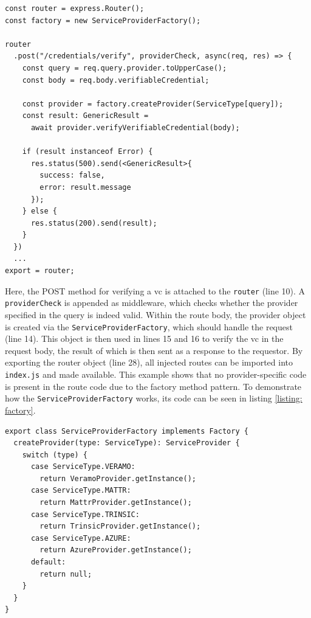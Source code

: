 \begin{lstlisting}[style=ES6, caption=Extract of verifier routes, label={listing: verifier routes}]
const router = express.Router();
const factory = new ServiceProviderFactory();

router
  .post("/credentials/verify", providerCheck, async(req, res) => {
    const query = req.query.provider.toUpperCase();
    const body = req.body.verifiableCredential;
    
    const provider = factory.createProvider(ServiceType[query]);
    const result: GenericResult =
      await provider.verifyVerifiableCredential(body);
      
    if (result instanceof Error) {
      res.status(500).send(<GenericResult>{ 
        success: false, 
        error: result.message 
      });
    } else {
      res.status(200).send(result);
    }
  })
  ...
export = router;
\end{lstlisting}

    Here, the POST method for verifying a \ac{vc} is attached to the \texttt{router} (line 10). A \texttt{providerCheck} is appended as middleware, which checks whether the provider specified in the query is indeed valid. Within the route body, the provider object is created via the \texttt{ServiceProviderFactory}, which should handle the request (line 14). This object is then used in lines 15 and 16 to verify the \ac{vc} in the request body, the result of which is then sent as a response to the requestor. By exporting the router object (line 28), all injected routes can be imported into \texttt{index.js} and made available. This example shows that no provider-specific code is present in the route code due to the factory method pattern. To demonstrate how the \texttt{ServiceProviderFactory} works, its code can be seen in listing \ref{listing: factory}.
    \newpage
\begin{lstlisting}[style=ES6, caption=Extract of service provider factory, label={listing: factory}]
export class ServiceProviderFactory implements Factory {
  createProvider(type: ServiceType): ServiceProvider {
    switch (type) {
      case ServiceType.VERAMO:
        return VeramoProvider.getInstance();
      case ServiceType.MATTR:
        return MattrProvider.getInstance();
      case ServiceType.TRINSIC:
        return TrinsicProvider.getInstance();
      case ServiceType.AZURE:
        return AzureProvider.getInstance();
      default:
        return null;
    }
  }
}
\end{lstlisting}

